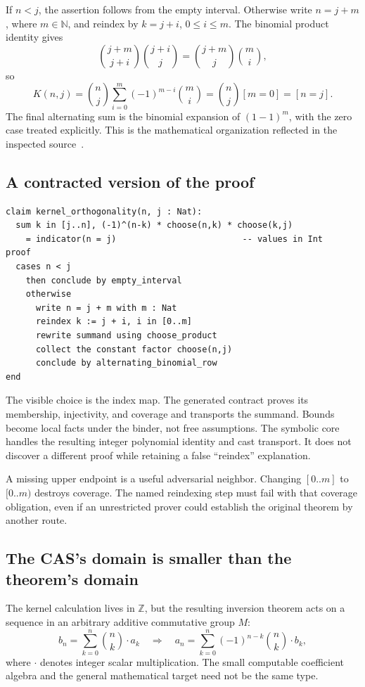 \documentclass[11pt,a4paper]{article}
\newcommand{\N}{\mathbb N}
\newcommand{\Z}{\mathbb Z}
\theoremstyle{definition}
\begin{document}
If \(n<j\), the assertion follows from the empty interval. Otherwise write \(n=j+m\), where \(m\in\N\), and reindex by \(k=j+i\), \(0\le i\le m\). The binomial product identity gives
\[
 \binom{j+m}{j+i}\binom{j+i}{j}
   =\binom{j+m}{j}\binom mi,
\]
so
\[
 K(n,j)=\binom nj
       \sum_{i=0}^{m}(-1)^{m-i}\binom mi
       =\binom nj[m=0]=[n=j].
\]
The final alternating sum is the binomial expansion of \((1-1)^m\), with the zero case treated explicitly. This is the mathematical organization reflected in the inspected source~\cite{pbin}.

\subsection{A contracted version of the proof}
\par\noindent\begin{minipage}{\linewidth}
\begin{lstlisting}
claim kernel_orthogonality(n, j : Nat):
  sum k in [j..n], (-1)^(n-k) * choose(n,k) * choose(k,j)
    = indicator(n = j)                         -- values in Int
proof
  cases n < j
    then conclude by empty_interval
    otherwise
      write n = j + m with m : Nat
      reindex k := j + i, i in [0..m]
      rewrite summand using choose_product
      collect the constant factor choose(n,j)
      conclude by alternating_binomial_row
end
\end{lstlisting}
\end{minipage}\par

The visible choice is the index map. The generated contract proves its membership, injectivity, and coverage and transports the summand. Bounds become local facts under the binder, not free assumptions. The symbolic core handles the resulting integer polynomial identity and cast transport. It does not discover a different proof while retaining a false ``reindex'' explanation.

A missing upper endpoint is a useful adversarial neighbor. Changing \([0..m]\) to \([0..m)\) destroys coverage. The named reindexing step must fail with that coverage obligation, even if an unrestricted prover could establish the original theorem by another route.

\subsection{The CAS's domain is smaller than the theorem's domain}
The kernel calculation lives in \(\Z\), but the resulting inversion theorem acts on a sequence in an arbitrary additive commutative group \(M\):
\[
 b_n=\sum_{k=0}^{n}\binom nk\,\boldsymbol{\cdot}\,a_k
 \quad\Longrightarrow\quad
 a_n=\sum_{k=0}^{n}(-1)^{n-k}\binom nk\,\boldsymbol{\cdot}\,b_k,
\]
where \(\boldsymbol{\cdot}\) denotes integer scalar multiplication. The small computable coefficient algebra and the general mathematical target need not be the same type.
\end{document}
